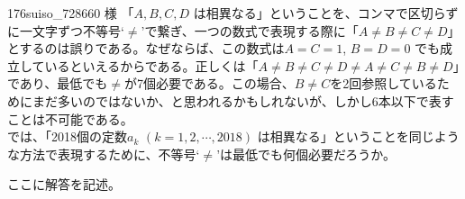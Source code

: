 \begin{prob}{176}{}{suiso\_728660 様}
 「$A, B, C, D$ は相異なる」ということを、コンマで区切らずに一文字ずつ不等号`$\neq$'で繋ぎ、一つの数式で表現する際に「$A\neq B\neq C\neq D$」とするのは誤りである。なぜならば、この数式は$A=C=1$, $B=D=0$ でも成立しているといえるからである。正しくは「$A\neq B\neq C\neq D\neq A\neq C\neq B\neq D$」であり、最低でも$\neq$が7個必要である。この場合、$B\neq C$を2回参照しているためにまだ多いのではないか、と思われるかもしれないが、しかし6本以下で表すことは不可能である。\\
 では、「2018個の定数$a_k$ $(k=1, 2, \cdots, 2018)$ は相異なる」ということを同じような方法で表現するために、不等号`$\neq$'は最低でも何個必要だろうか。
\end{prob}
ここに解答を記述。